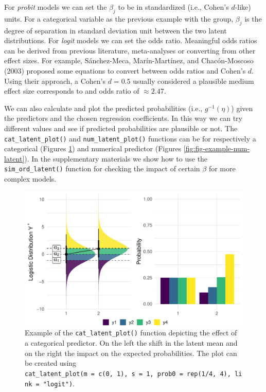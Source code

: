 \documentclass[
  man,floatsintext]{apa6}
\begin{document}
For \emph{probit} models we can set the \(\beta_j\) to be in standardized (i.e., Cohen's \(d\)-like) units. For a categorical variable as the previous example with the group, \(\beta_j\) is the degree of separation in standard deviation unit between the two latent distributions. For \emph{logit} models we can set the odds ratio. Meaningful odds ratios can be derived from previous literature, meta-analyses or converting from other effect sizes. For example, Sánchez-Meca, Marín-Martínez, and Chacón-Moscoso (2003) proposed some equations to convert between odds ratios and Cohen's \(d\). Using their approach, a Cohen's \(d = 0.5\) usually considered a plausible medium effect size corresponds to and odds ratio of \(\approx 2.47\).

We can also calculate and plot the predicted probabilities (i.e., \(g^{-1}(\eta)\)) given the predictors and the chosen regression coefficients. In this way we can try different values and see if predicted probabilities are plausible or not. The \texttt{cat\_latent\_plot()} and \texttt{num\_latent\_plot()} functions can be for respectively a categorical (Figures \ref{fig:fig-example-cat-latent}) and numerical predictor (Figures \ref{fig:fig-example-num-latent}). In the supplementary materials we show how to use the \texttt{sim\_ord\_latent()} function for checking the impact of certain \(\beta\) for more complex models.

\scriptsize

\begin{figure}

{\centering \includegraphics[width=1\linewidth]{paper_files/figure-latex/fig-example-cat-latent-1} 

}

\caption{Example of the \texttt{cat\_latent\_plot()} function depicting the effect of a categorical predictor. On the left the shift in the latent mean and on the right the impact on the expected probabilities. The plot can be created using \texttt{cat\_latent\_plot(m\ =\ c(0,\ 1),\ s\ =\ 1,\ prob0\ =\ rep(1/4,\ 4),\ link\ =\ "logit")}.}\label{fig:fig-example-cat-latent}
\end{figure}
\end{document}
